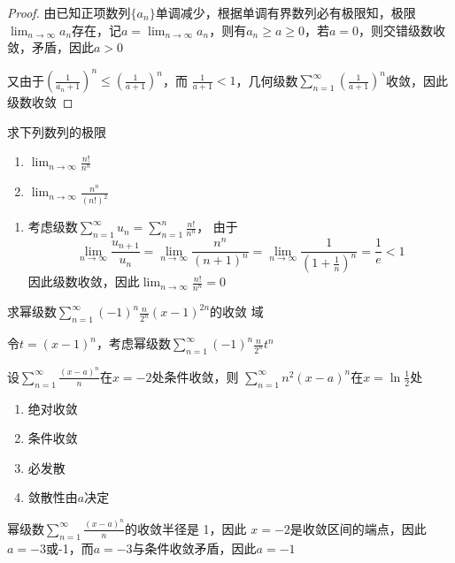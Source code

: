 \documentclass{article}
\begin{document}
\begin{proof}
由已知正项数列\(\{a_n\}\)单调减少，根据单调有界数列必有极限知，极限
\(\lim_{n\to\infty}a_n\)存在，记\(a=\lim_{n\to\infty}a_n\)，则有\(a_n\ge
   a\ge0\)，若\(a=0\)，则交错级数收敛，矛盾，因此\(a>0\)

又由于\(\left(\frac{1}{a_n+1}\right)^n\le\left(\frac{1}{a+1}\right)^n\)，而
\(\frac{1}{a+1}<1\)，几何级数\(\sum_{n=1}^\infty(\frac{1}{a+1})^n\)收敛，因此
级数收敛
\end{proof}

\begin{examplle}[]
求下列数列的极限
\begin{enumerate}
\item \(\displaystyle\lim_{n\to\infty}\frac{n!}{n^n}\)
\item \(\displaystyle\lim_{n\to\infty}\frac{n^n}{(n!)^2}\)
\end{enumerate}


\begin{enumerate}
\item 考虑级数\(\displaystyle\sum_{n=1}^\infty u_n=\sum_{n=1}^n\frac{n!}{n^n}\)，
由于
\begin{equation*}
\lim_{n\to\infty}\frac{u_{n+1}}{u_n}=\lim_{n\to\infty}\frac{n^n}{(n+1)^n}=
\lim_{n\to\infty}\frac{1}{(1+\frac{1}{n})^n}=\frac{1}{e}<1
\end{equation*}
因此级数收敛，因此\(\displaystyle\lim_{n\to\infty}\frac{n!}{n^n}=0\)
\end{enumerate}
\end{examplle}

\begin{examplle}[]
求幂级数\(\displaystyle\sum_{n=1}^\infty(-1)^n\frac{n}{2^n}(x-1)^{2n}\)的收敛
域

令\(t=(x-1)^n\)，考虑幂级数\(\displaystyle\sum_{n=1}^\infty(-1)^n\frac{n}{2^n}t^n\)
\end{examplle}

\begin{examplle}[]
设\(\displaystyle\sum_{n=1}^\infty\frac{(x-a)^n}{n}\)在\(x=-2\)处条件收敛，则
\(\displaystyle\sum_{n=1}^\infty n^2(x-a)^n\)在\(x=\ln\frac{1}{2}\)处
\begin{enumerate}
\item 绝对收敛
\item 条件收敛
\item 必发散
\item 敛散性由\(a\)决定
\end{enumerate}


幂级数\(\displaystyle\sum_{n=1}^\infty\frac{(x-a)^n}{n}\)的收敛半径是 1，因此
\(x=-2\)是收敛区间的端点，因此\(a=-3\)或-1，而\(a=-3\)与条件收敛矛盾，因此\(a=-1\)
\end{examplle}
\end{document}
